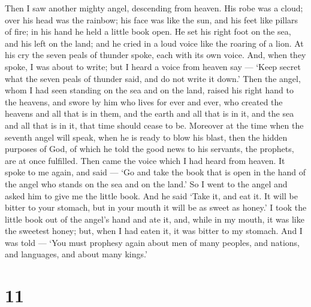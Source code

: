  Then I saw another mighty angel, descending from heaven.
His robe was a cloud; over his head was the rainbow; his face was like
the sun, and his feet like pillars of fire;  in his hand he
held a little book open. He set his right foot on the sea, and his left
on the land;  and he cried in a loud voice like the roaring
of a lion. At his cry the seven peals of thunder spoke, each with its
own voice.  And, when they spoke, I was about to write; but
I heard a voice from heaven say --- `Keep secret what the seven peals of
thunder said, and do not write it down.'  Then the angel,
whom I had seen standing on the sea and on the land, raised his right
hand to the heavens,  and swore by him who lives for ever
and ever, who created the heavens and all that is in them, and the earth
and all that is in it, and the sea and all that is in it, that time
should cease to be.  Moreover at the time when the seventh
angel will speak, when he is ready to blow his blast, then the hidden
purposes of God, of which he told the good news to his servants, the
prophets, are at once fulfilled.  Then came the voice which
I had heard from heaven. It spoke to me again, and said --- `Go and take
the book that is open in the hand of the angel who stands on the sea and
on the land.'  So I went to the angel and asked him to give
me the little book. And he said `Take it, and eat it. It will be bitter
to your stomach, but in your mouth it will be as sweet as honey.'
 I took the little book out of the angel's hand and ate it,
and, while in my mouth, it was like the sweetest honey; but, when I had
eaten it, it was bitter to my stomach.  And I was told ---
`You must prophesy again about men of many peoples, and nations, and
languages, and about many kings.'

\hypertarget{section-10}{%
\section{11}\label{section-10}}

